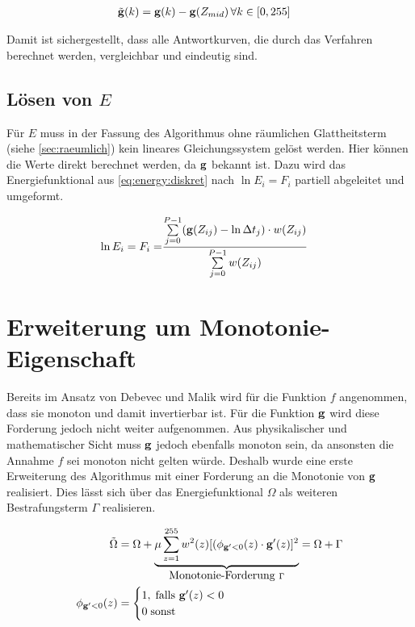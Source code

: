 \begin{align}
\tilde{\mathbf g}(k) &= \mathbf g(k)-\mathbf g(Z_{mid})\, \forall k \in [0,255]
\end{align}

Damit ist sichergestellt, dass alle Antwortkurven, die durch das Verfahren berechnet werden, vergleichbar und eindeutig sind.



\subsection{Lösen von $E$}
Für $E$ muss in der Fassung des Algorithmus ohne räumlichen Glattheitsterm (siehe \autoref{sec:raeumlich}) kein lineares Gleichungssystem  gelöst werden. Hier können die Werte direkt berechnet werden, da $\mathbf g$ bekannt ist. Dazu wird das Energiefunktional aus \autoref{eq:energy:diskret} nach $\ln E_i = F_i$ partiell abgeleitet und umgeformt.    

\begin{align}
\label{eq:fi:basic}
    \ln E_i = F_i =& \frac{\sum \limits_{j=0}^{P-1} (\mathbf g(Z_{ij})-\ln \Delta t_j)\cdot w(Z_{ij})}{\sum \limits_{j=0}^{P-1} w(Z_{ij})}
\end{align}



\section{Erweiterung um Monotonie-Eigenschaft}
\label{sec:monotonie}

Bereits im Ansatz von Debevec und Malik wird für die Funktion $f$ angenommen, dass sie monoton und damit invertierbar ist. Für die Funktion $\mathbf g$ wird diese Forderung jedoch nicht weiter aufgenommen. Aus physikalischer und mathematischer Sicht muss $\mathbf g$ jedoch ebenfalls monoton sein, da ansonsten die Annahme $f$ sei monoton nicht gelten würde. Deshalb wurde eine erste Erweiterung des Algorithmus mit einer Forderung an die Monotonie von $\mathbf g$ realisiert. Dies lässt sich über das Energiefunktional $\Omega$ als weiteren Bestrafungsterm $\Gamma$ realisieren.

\begin{align}
\tilde{\Omega} &= \Omega + \underbrace{\mu \sum \limits_{z=1}^{255} w^2(z) [(\phi_{\mathbf g'<0}(z)\cdot \mathbf g'(z)]^2}_{\mbox{Monotonie-Forderung } \Gamma} = \Omega + \Gamma\\
\phi_{\mathbf g'<0}(z) &= 
    \begin{cases} 
        1, \; \mbox{falls } \mathbf g'(z) < 0\\ 
        0 \; \mbox{sonst}
    \end{cases}
\end{align}

